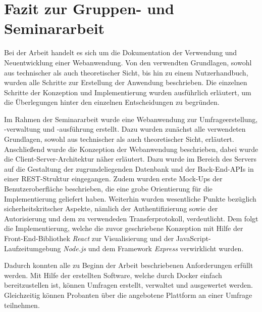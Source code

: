 \section{Fazit zur Gruppen- und Seminararbeit}
\label{sec:Fazit}

Bei der Arbeit handelt es sich um die Dokumentation der Verwendung und Neuentwicklung einer Webanwendung.
Von den verwendten Grundlagen, sowohl aus technischer als auch theoretischer Sicht, bis hin zu einem Nutzerhandbuch, wurden alle Schritte zur Erstellung der Anwendung beschrieben.
Die einzelnen Schritte der Konzeption und Implementierung wurden ausführlich erläutert, um die Überlegungen hinter den einzelnen Entscheidungen zu begründen.

Im Rahmen der Seminararbeit wurde eine Webanwendung zur Umfrageerstellung, -verwaltung und -ausführung erstellt.
Dazu wurden zunächst alle verwendeten Grundlagen, sowohl aus technischer als auch theoretischer Sicht, erläutert.
Anschließend wurde die Konzeption der Webanwendung beschrieben, dabei wurde die Client-Server-Architektur näher erläutert.
Dazu wurde im Bereich des Servers auf die Gestaltung der zugrundeliegenden Datenbank und der Back-End-\acp{API} in einer \ac{REST}-Struktur eingegangen.
Zudem wurden erste Mock-Ups der Benutzeroberfläche beschrieben, die eine grobe Orientierung für die Implementierung geliefert haben.
Weiterhin wurden wesentliche Punkte bezüglich sicherheitskritscher Aspekte, nämlich der Authentifizierung sowie der Autorisierung und dem zu verwendeden Transferprotokoll, verdeutlicht.
Dem folgt die Implementierung, welche die zuvor geschriebene Konzeption mit Hilfe der Front-End-Bibliothek \emph{React} zur Visualisierung und der JavaScript-Laufzeitumgebung \emph{Node.js} und dem Framework \emph{Express} verwirklicht wurden.

Dadurch konnten alle zu Beginn der Arbeit beschriebenen Anforderungen erfüllt werden.
Mit Hilfe der erstellten Software, welche durch Docker einfach bereitzustellen ist, können Umfragen erstellt, verwaltet und ausgewertet werden.
Gleichzeitig können Probanten über die angebotene Plattform an einer Umfrage teilnehmen.